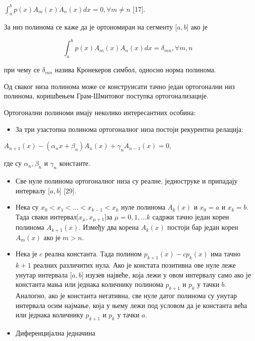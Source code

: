 \(\int_{a}^{b}p(x)A_{m}(x)A_{n}(x)dx = 0,\forall m \neq n\) {[}17{]}.

За низ полинома се каже да је ортономиран на сегменту
\(\lbrack a,b\rbrack\) ако је

\[\int_{a}^{b}p(x)A_{m}(x)A_{n}(x)dx = \delta_{mn},\forall m,n\]

при чему се \(\delta_{mn}\) назива Кронекеров симбол, односно норма
полинома.

Од сваког низа полинома може се конструисати тачно један ортогонални низ
полинома, коришћењем Грам-Шмитовог поступка ортогонализације.

Ортогонални полиноми имају неколико интересантних особина:

\begin{itemize}
\item
  За три узастопна полинома ортогоналног низа постоји рекурентна
  релација:
\end{itemize}

\(A_{n + 1}(x) - (\alpha_{n}x + \beta_{n})A_{n}(x) + \gamma_{n}A_{n - 1}(x) = 0\),

где су \(\alpha_{n},\beta_{n}\) и \(\gamma_{n}\) константе.

\begin{itemize}
\item
  Све нуле полинома ортогоналног низа су реалне, једноструке и припадају
  интервалу \(\lbrack a,b\rbrack\) {[}29{]}.
\item
  Нека су \(x_{0} < x_{1} < ... < x_{k - 1} < x_{k}\) нуле полинома
  \(A_{k}(x)\) и \(x_{0} = a\) и \(x_{k} = b\). Тада сваки
  интервал\(\lbrack x_{\mu},x_{\mu + 1}\rbrack\)за \(\mu = 0,1,...k\)
  садржи тачно један корен полинома \(A_{k + 1}(x)\). Између два корена
  \(A_{k}(x)\) постоји бар један корен \(A_{m}(x)\) ако је \(m > n\).
\item
  Нека је \(c\) реална константа. Тада полином
  \(p_{k + 1}(x) - cp_{k}(x)\) има тачно \(k + 1\) реалних различитих
  нула. Ако је констата позитивна ове нуле леже унутар интервала
  \(\lbrack a,b\rbrack\) изузев највеће, која лежи у овом интервалу само
  ако је константа мања или једнака количнику полинома \(p_{k + 1}\) и
  \(p_{k}\) у тачки \(b\). Аналогно, ако је константа негативна, све
  нуле датог полинома су унутар интервала осим најмање, која у њему лежи
  под условом да је константа већа или једнака количнику \(p_{k + 1}\) и
  \(p_{k}\) у тачки \(a\).
\end{itemize}

\begin{itemize}
\item
  Диференцијална једначина
\end{itemize}

